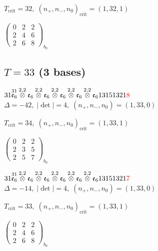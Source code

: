 \documentclass[10pt]{article}
\begin{document}
\hspace{1em}$T_{\text{crit}}=32,\; (n_+,n_-,n_0)_{\text{crit}}=(1,32,1)$

\hspace{2em}$\left(\begin{smallmatrix}0 & 2 & 2 \\ 2 & 4 & 6 \\ 2 & 6 & 8\end{smallmatrix}\right)_{\!b_0}$


\subsection*{$T = 33$ \quad (3 bases)}
\smallskip

$31\overset{31}{\mathfrak{e}_6}\overset{2,2}{\otimes}\mathfrak{e}_6\overset{2,2}{\otimes}\mathfrak{e}_6\overset{2,2}{\otimes}\mathfrak{e}_6\overset{2,2}{\otimes}\mathfrak{e}_6\overset{2,2}{\otimes}\mathfrak{e}_613151321\textcolor{red}{8}$ \quad $\Delta=-42,\; |\det|=4,\; (n_+,n_-,n_0)=(1,33,0)$

\hspace{1em}$T_{\text{crit}}=34,\; (n_+,n_-,n_0)_{\text{crit}}=(1,33,1)$

\hspace{2em}$\left(\begin{smallmatrix}0 & 2 & 2 \\ 2 & 3 & 5 \\ 2 & 5 & 7\end{smallmatrix}\right)_{\!b_0}$

$31\overset{31}{\mathfrak{e}_6}\overset{2,2}{\otimes}\mathfrak{e}_6\overset{2,2}{\otimes}\mathfrak{e}_6\overset{2,2}{\otimes}\mathfrak{e}_6\overset{2,2}{\otimes}\mathfrak{e}_6\overset{2,2}{\otimes}\mathfrak{e}_613151321\textcolor{red}{7}$ \quad $\Delta=-14,\; |\det|=4,\; (n_+,n_-,n_0)=(1,33,0)$

\hspace{1em}$T_{\text{crit}}=33,\; (n_+,n_-,n_0)_{\text{crit}}=(1,33,1)$

\hspace{2em}$\left(\begin{smallmatrix}0 & 2 & 2 \\ 2 & 4 & 6 \\ 2 & 6 & 8\end{smallmatrix}\right)_{\!b_0}$
\end{document}
